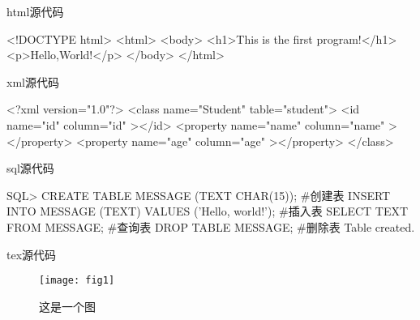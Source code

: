 html源代码
\begin{html}
    <!DOCTYPE html>  
    <html>  
        <body>  
            <h1>This is the first program!</h1>  
            <p>Hello,World!</p>  
        </body>  
    </html>
\end{html}

xml源代码 
\begin{xml}
    <?xml version="1.0"?>
    <class name="Student" table="student">
        <id name="id" column="id" ></id>
        <property name="name" column="name" ></property>
        <property name="age" column="age" ></property>
    </class> 
\end{xml}

sql源代码 
\begin{sql}
    SQL> CREATE TABLE MESSAGE (TEXT CHAR(15));            #创建表  
    INSERT INTO MESSAGE (TEXT) VALUES ('Hello, world!');  #插入表  
    SELECT TEXT FROM MESSAGE;                             #查询表  
    DROP TABLE MESSAGE;                                   #删除表               
    Table created.   
\end{sql}

tex源代码 
\begin{tex}
    \begin{figure}[H]
        \centering 
        \texttt{[image: fig1]} 
        \caption{这是一个图}
        \label{fig:single2}
    \end{figure}
\end{tex}